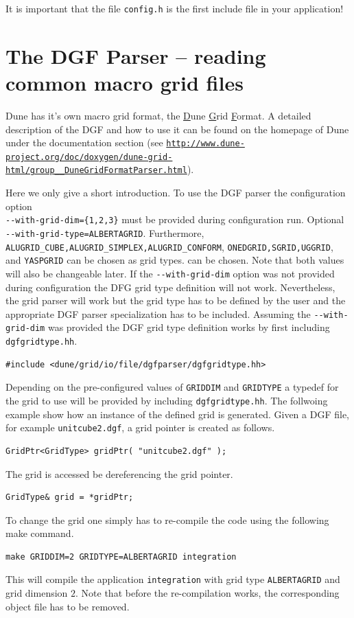 \documentclass[11pt,a4paper,headinclude,footinclude,DIV16,normalheadings]{scrreprt}
\begin{document}
It is important that the file \lstinline!config.h! is the first
include file in your application!

\section{The DGF Parser -- reading common macro grid files}

Dune has it's own macro grid format, the \underline{D}une \underline{G}rid \underline{F}ormat. 
A detailed description of the DGF and how to use it can be found on the
homepage of Dune under the documentation section (see 
\href{http://www.dune-project.org/doc/doxygen/dune-grid-html/group__DuneGridFormatParser.html}%
{{\small\texttt{http://www.dune-project.org/doc/doxygen/dune-grid-html/group\_\_DuneGridFormatParser.html}}}).

Here we only give a short introduction. To use the DGF parser the configuration 
option \\ 
\lstinline!--with-grid-dim={1,2,3}! must be provided 
during configuration run. Optional \\ 
\lstinline!--with-grid-type=ALBERTAGRID!.
Furthermore, \lstinline!ALUGRID_CUBE,ALUGRID_SIMPLEX,ALUGRID_CONFORM!, 
\lstinline!ONEDGRID,SGRID,UGGRID!, and \lstinline!YASPGRID! can be chosen as grid types.
can be chosen. Note that both values will also be changeable later. 
If the \lstinline!--with-grid-dim! option was not provided during configuration the 
DFG grid type definition will not work. Nevertheless, the grid parser will work 
but the grid type has to be defined by the user and the appropriate DGF parser 
specialization has to be included. 
Assuming the \lstinline!--with-grid-dim! was provided the DGF grid type 
definition works by first including \lstinline!dgfgridtype.hh!.
\begin{lstlisting}[basicstyle=\ttfamily\scriptsize]
#include <dune/grid/io/file/dgfparser/dgfgridtype.hh>
\end{lstlisting}
Depending on the pre-configured values of \lstinline!GRIDDIM! and
\lstinline!GRIDTYPE! a typedef for the grid to use will be provided by
including \lstinline!dgfgridtype.hh!. The follwoing example show how an 
instance of the defined grid is generated. Given a DGF file, for example 
\lstinline!unitcube2.dgf!, a grid pointer is created as follows.
\begin{lstlisting}[basicstyle=\ttfamily\scriptsize]
GridPtr<GridType> gridPtr( "unitcube2.dgf" );
\end{lstlisting}
The grid is accessed be dereferencing the grid pointer.
\begin{lstlisting}[basicstyle=\ttfamily\scriptsize]
GridType& grid = *gridPtr; 
\end{lstlisting}
To change the grid one simply has to re-compile the code using the following make command.
\begin{lstlisting}[basicstyle=\ttfamily\scriptsize]
make GRIDDIM=2 GRIDTYPE=ALBERTAGRID integration 
\end{lstlisting}
This will compile the application \texttt{integration} with grid type \lstinline!ALBERTAGRID! and grid dimension $2$.
Note that before the re-compilation works, 
the corresponding object file has to be removed.
\end{document}
